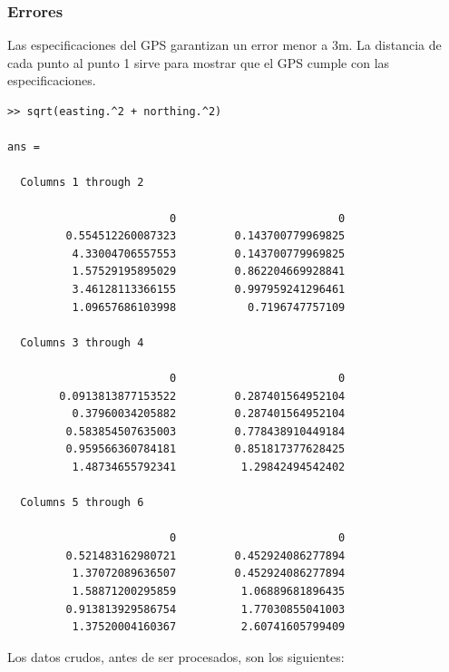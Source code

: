 \documentclass[spanish,12pt,a4paper,titlepage]{report}
\begin{document}
\subsubsection*{Errores}
\label{sec:errores}

Las especificaciones del GPS garantizan un error menor a 3m. La distancia de cada punto al punto 1 sirve para mostrar que el GPS cumple con las especificaciones. 

\begin{verbatim}
>> sqrt(easting.^2 + northing.^2)

ans =

  Columns 1 through 2

                         0                         0
         0.554512260087323         0.143700779969825
          4.33004706557553         0.143700779969825
          1.57529195895029         0.862204669928841
          3.46128113366155         0.997959241296461
          1.09657686103998           0.7196747757109

  Columns 3 through 4

                         0                         0
        0.0913813877153522         0.287401564952104
          0.37960034205882         0.287401564952104
         0.583854507635003         0.778438910449184
         0.959566360784181         0.851817377628425
          1.48734655792341          1.29842494542402

  Columns 5 through 6

                         0                         0
         0.521483162980721         0.452924086277894
          1.37072089636507         0.452924086277894
          1.58871200295859          1.06889681896435
         0.913813929586754          1.77030855041003
          1.37520004160367          2.60741605799409
\end{verbatim}

\newpage
Los datos crudos, antes de ser procesados, son los siguientes:
\end{document}
